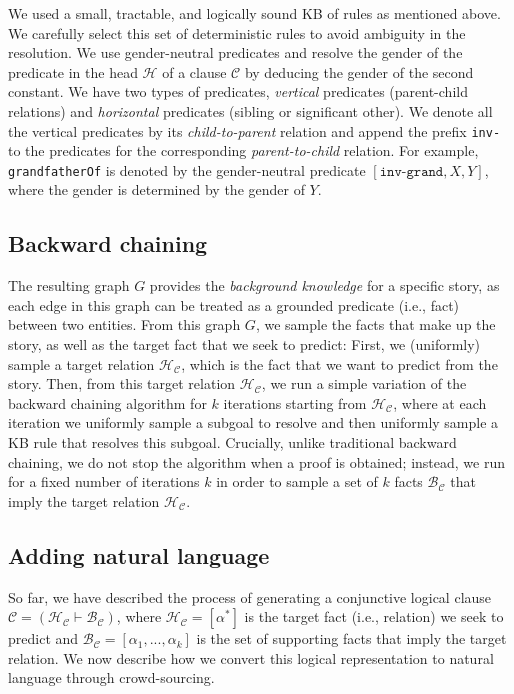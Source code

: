 \documentclass[letterpaper, 12pt]{report}
\begin{document}
We used a small, tractable, and logically sound KB of rules as mentioned above. We carefully select this set of deterministic rules to avoid ambiguity in the resolution. We use gender-neutral predicates and resolve the gender of the predicate in the head $\mathcal{H}$ of a clause $\mathcal{C}$ by deducing the gender of the second constant. We have two types of predicates, \textit{vertical} predicates (parent-child relations) and  \textit{horizontal} predicates (sibling or significant other). We denote all the vertical predicates by its \textit{child-to-parent} relation and append the prefix \texttt{inv-} to the predicates for the corresponding \textit{parent-to-child} relation. For example, \texttt{grandfatherOf} is denoted by the gender-neutral predicate $[\texttt{inv-grand},X,Y]$, where the gender is determined by the gender of $Y$.



\subsection{Backward chaining}
The resulting graph $G$ provides the \textit{background knowledge} for a specific story, as each edge in this graph can be treated as a grounded predicate (i.e., fact) between two entities.
From this graph $G$, we sample the facts that make up the story, as well as the target fact that we seek to predict:
First, we (uniformly) sample a target relation $\mathcal{H}_{\mathcal{C}}$, which is the fact that we want to predict from the story.
Then, from this target relation $\mathcal{H}_{\mathcal{C}}$,  we run a simple variation of the backward chaining \citep{gallaire1978logic} algorithm for $k$ iterations starting from $\mathcal{H}_{\mathcal{C}}$, where at each iteration we uniformly sample a subgoal to resolve and then uniformly sample a KB rule that resolves this subgoal.
Crucially, unlike traditional backward chaining, we do not stop the algorithm when a proof is obtained; instead, we run for a fixed number of iterations $k$ in order to sample a set of $k$ facts $\mathcal{B}_{\mathcal{C}}$ that imply the target relation $\mathcal{H}_{\mathcal{C}}$.

\subsection{Adding natural language}
\label{subsec:clutrr_nat_lang}

So far, we have described the process of generating a  conjunctive logical clause $\mathcal{C}=(\mathcal{H}_{\mathcal{C}} \vdash \mathcal{B}_{\mathcal{C}})$, where $\mathcal{H}_{\mathcal{C}}=[\alpha^*]$ is the target fact (i.e., relation) we seek to predict and $\mathcal{B}_{\mathcal{C}} = [\alpha_1, ..., \alpha_k]$ is the set of supporting facts that imply the target relation.
We now describe how we convert this logical representation to natural language through crowd-sourcing.
\end{document}
